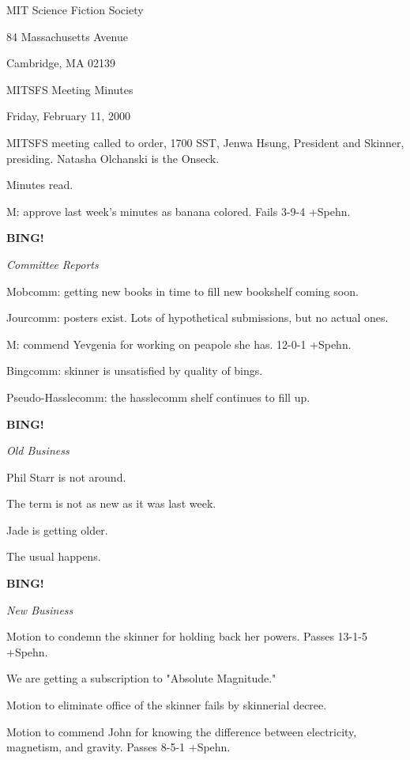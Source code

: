 \documentclass[12pt]{article}
\newcommand{\bing}{{\bf BING!} }
\newcommand{\goto}[1]{\bing \vskip 12pt \centerline{{\em{#1}}}}
\begin{document}
\begin{center}

MIT Science Fiction Society 

84 Massachusetts Avenue

Cambridge, MA 02139

\vspace{12pt}

MITSFS Meeting Minutes 

Friday, February 11, 2000

\end{center}
 
\vspace{18pt}

\setlength{\parskip}{6pt}

\noindent
MITSFS meeting called to order, 1700 SST, Jenwa Hsung, President and
Skinner, presiding.  Natasha Olchanski is the Onseck.

Minutes read.

M: approve last week's minutes as banana colored. Fails 3-9-4 +Spehn.

\goto{Committee Reports}

Mobcomm: getting new books in time to fill new bookshelf coming soon.

Jourcomm: posters exist. Lots of hypothetical submissions, but no actual ones.

M: commend Yevgenia for working on peapole she has. 12-0-1 +Spehn.

Bingcomm: skinner is unsatisfied by quality of bings.

Pseudo-Hasslecomm: the hasslecomm shelf continues to fill up.

\goto{Old Business}

Phil Starr is not around.

The term is not as new as it was last week.

Jade is getting older.

The usual happens.

\goto{New Business}

Motion to condemn the skinner for holding back her powers. Passes 13-1-5 +Spehn.

We are getting a subscription to "Absolute Magnitude."

Motion to eliminate office of the skinner fails by skinnerial decree.

Motion to commend John for knowing the difference between electricity, magnetism, and gravity. Passes 8-5-1 +Spehn.
\end{document}
